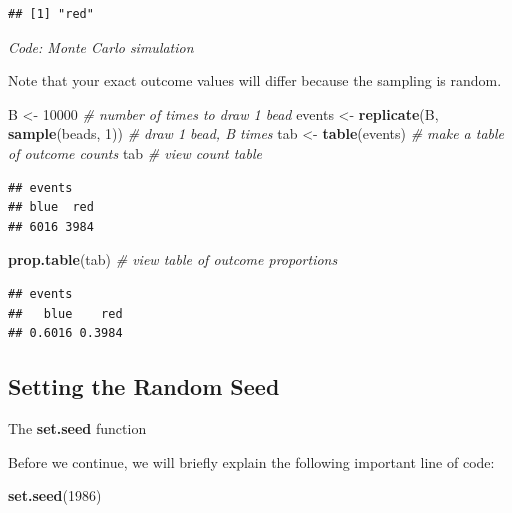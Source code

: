 \documentclass[
]{article}
\newenvironment{Shaded}{\begin{snugshade}}{\end{snugshade}}
\newcommand{\CommentTok}[1]{\textcolor[rgb]{0.56,0.35,0.01}{\textit{#1}}}
\newcommand{\DecValTok}[1]{\textcolor[rgb]{0.00,0.00,0.81}{#1}}
\newcommand{\KeywordTok}[1]{\textcolor[rgb]{0.13,0.29,0.53}{\textbf{#1}}}
\newcommand{\NormalTok}[1]{#1}
\newcommand{\StringTok}[1]{\textcolor[rgb]{0.31,0.60,0.02}{#1}}
\begin{document}
\begin{verbatim}
## [1] "red"
\end{verbatim}

\emph{Code: Monte Carlo simulation}

Note that your exact outcome values will differ because the sampling is
random.

\begin{Shaded}
\begin{Highlighting}[]
\NormalTok{B \textless{}{-}}\StringTok{ }\DecValTok{10000}    \CommentTok{\# number of times to draw 1 bead}
\NormalTok{events \textless{}{-}}\StringTok{ }\KeywordTok{replicate}\NormalTok{(B, }\KeywordTok{sample}\NormalTok{(beads, }\DecValTok{1}\NormalTok{))    }\CommentTok{\# draw 1 bead, B times}
\NormalTok{tab \textless{}{-}}\StringTok{ }\KeywordTok{table}\NormalTok{(events)    }\CommentTok{\# make a table of outcome counts}
\NormalTok{tab    }\CommentTok{\# view count table}
\end{Highlighting}
\end{Shaded}

\begin{verbatim}
## events
## blue  red 
## 6016 3984
\end{verbatim}

\begin{Shaded}
\begin{Highlighting}[]
\KeywordTok{prop.table}\NormalTok{(tab)    }\CommentTok{\# view table of outcome proportions}
\end{Highlighting}
\end{Shaded}

\begin{verbatim}
## events
##   blue    red 
## 0.6016 0.3984
\end{verbatim}

\hypertarget{setting-the-random-seed}{%
\subsection{Setting the Random Seed}\label{setting-the-random-seed}}

The \textbf{set.seed} function

Before we continue, we will briefly explain the following important line
of code:

\begin{Shaded}
\begin{Highlighting}[]
\KeywordTok{set.seed}\NormalTok{(}\DecValTok{1986}\NormalTok{)}
\end{Highlighting}
\end{Shaded}
\end{document}
